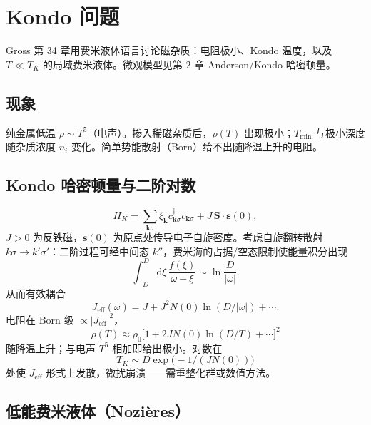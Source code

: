 \section{Kondo 问题}

Gross 第 34 章用费米液体语言讨论磁杂质：电阻极小、Kondo 温度，以及 $T\ll T_K$ 的局域费米液体。微观模型见第 2 章 Anderson/Kondo 哈密顿量。

\subsection{现象}

纯金属低温 $\rho\sim T^5$（电声）。掺入稀磁杂质后，$\rho(T)$ 出现极小；$T_{\min}$ 与极小深度随杂质浓度 $n_i$ 变化。简单势能散射（Born）给不出随降温上升的电阻。

\subsection{Kondo 哈密顿量与二阶对数}

\begin{equation}
  H_K
  =\sum_{\mathbf{k}\sigma}\xi_{\mathbf{k}}c_{\mathbf{k}\sigma}^\dagger c_{\mathbf{k}\sigma}
  +J\,\mathbf{S}\cdot\mathbf{s}(0),
\end{equation}
$J>0$ 为反铁磁，$\mathbf{s}(0)$ 为原点处传导电子自旋密度。考虑自旋翻转散射 $k\sigma\to k'\sigma'$：二阶过程可经中间态 $k''$，费米海的占据/空态限制使能量积分出现
\begin{equation}
  \int_{-D}^{D}\mathrm{d}\xi\,
  \frac{f(\xi)}{\omega-\xi}
  \sim
  \ln\frac{D}{|\omega|}.
\end{equation}
从而有效耦合
\begin{equation}
  J_{\mathrm{eff}}(\omega)
  =J+J^2 N(0)\ln(D/|\omega|)+\cdots.
\label{eq:Jeff}
\end{equation}
电阻在 Born 级 $\propto |J_{\mathrm{eff}}|^2$，
\begin{equation}
  \rho(T)
  \approx
  \rho_0
  \bigl[1+2J N(0)\ln(D/T)+\cdots\bigr]^2
\end{equation}
随降温上升；与电声 $T^5$ 相加即给出极小。对数在
\begin{equation}
  T_K\sim D\exp\bigl(-1/(J N(0))\bigr)
\end{equation}
处使 $J_{\mathrm{eff}}$ 形式上发散，微扰崩溃——需重整化群或数值方法。

\subsection{低能费米液体（Nozi\`eres）}

